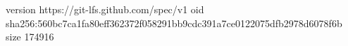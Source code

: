 version https://git-lfs.github.com/spec/v1
oid sha256:560bc7ca1fa80eff362372f058291bb9cdc391a7ce0122075dfb2978d6078f6b
size 174916
